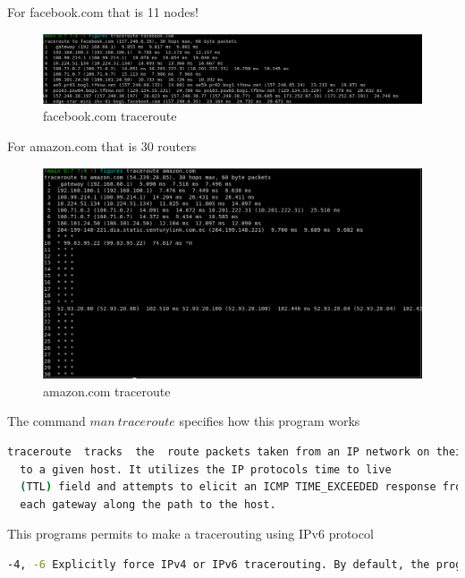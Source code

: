 \documentclass{assignment}
\begin{document}
For facebook.com that is 11 nodes!
\begin{figure}[h]
\begin{center}
  \includegraphics[scale=0.3]{figures/2_004.png}
\end{center}
\caption{facebook.com traceroute}
\end{figure}
\newpage
For amazon.com that is 30 routers
\begin{figure}[h]
\begin{center}
  \includegraphics[scale=0.3]{figures/2_003.png}
\end{center}
\caption{amazon.com traceroute}
\end{figure}

The command $man~traceroute$ specifies how this program works

\begin{lstlisting}[language=bash]
  traceroute  tracks  the  route packets taken from an IP network on their way
  to a given host. It utilizes the IP protocols time to live
  (TTL) field and attempts to elicit an ICMP TIME_EXCEEDED response from
  each gateway along the path to the host.
\end{lstlisting}

     \vspace{1cm}
This programs permits to make a tracerouting using IPv6 protocol
\begin{lstlisting}[language=bash]
-4, -6 Explicitly force IPv4 or IPv6 tracerouting. By default, the program will try to resolve the name given, and choose the  appropriate protocol automatically. If resolving a host name returns both IPv4 and IPv6 addresses, traceroute will use IPv4.
\end{lstlisting}
\end{document}
